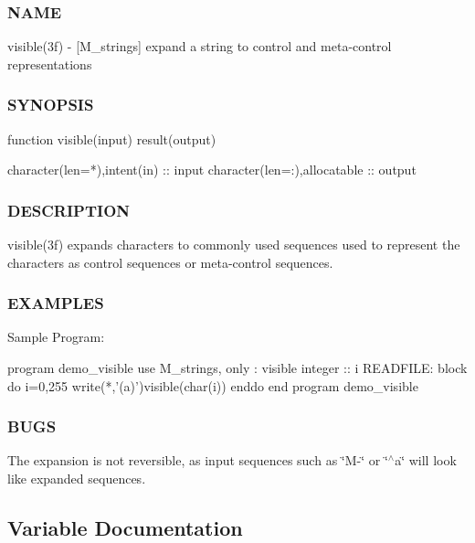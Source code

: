 \subsubsection*{N\+A\+ME}

visible(3f) -\/ \mbox{[}M\+\_\+strings\mbox{]} expand a string to control and meta-\/control representations 

\subsubsection*{S\+Y\+N\+O\+P\+S\+IS}

\begin{DoxyVerb}function visible(input) result(output)

 character(len=*),intent(in)           :: input
 character(len=:),allocatable          :: output
\end{DoxyVerb}
 \subsubsection*{D\+E\+S\+C\+R\+I\+P\+T\+I\+ON}

\begin{DoxyVerb} visible(3f) expands characters to commonly used sequences used to represent the characters
 as control sequences or meta-control sequences.
\end{DoxyVerb}


\subsubsection*{E\+X\+A\+M\+P\+L\+ES}

\begin{DoxyVerb}Sample Program:

 program demo_visible
 use M_strings, only : visible
 integer :: i
    READFILE: block
       do i=0,255
          write(*,'(a)')visible(char(i))
       enddo
 end program demo_visible
\end{DoxyVerb}
 \subsubsection*{B\+U\+GS}

The expansion is not reversible, as input sequences such as \char`\"{}\+M-\/\char`\"{} or \char`\"{}$^\wedge$a\char`\"{} will look like expanded sequences. 

\subsection{Variable Documentation}
\mbox{\label{namespacem__strings_ae939ea755cfa377c5ed5f09ba8b0e923}} 
